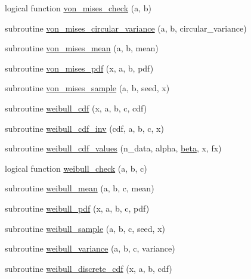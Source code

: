 \begin{DoxyCompactItemize}
\item 
logical function \hyperlink{_bhabha__fortran__sem__doxy_8f_a40a097c025b70be0e09b0de70e1da45b}{von\+\_\+mises\+\_\+check} (a, b)
\item 
subroutine \hyperlink{_bhabha__fortran__sem__doxy_8f_a662131cbe821a341319c8a9ca67f95af}{von\+\_\+mises\+\_\+circular\+\_\+variance} (a, b, circular\+\_\+variance)
\item 
subroutine \hyperlink{_bhabha__fortran__sem__doxy_8f_a97b8b21e59cd05efc755304eb6fd543f}{von\+\_\+mises\+\_\+mean} (a, b, mean)
\item 
subroutine \hyperlink{_bhabha__fortran__sem__doxy_8f_a385af85b16bbe1659e0de9e6e916d3d3}{von\+\_\+mises\+\_\+pdf} (x, a, b, pdf)
\item 
subroutine \hyperlink{_bhabha__fortran__sem__doxy_8f_a06bd71cbe32f074e5bb5ca85524936be}{von\+\_\+mises\+\_\+sample} (a, b, seed, x)
\item 
subroutine \hyperlink{_bhabha__fortran__sem__doxy_8f_ae3e1a96ae8ad17ffd698fba05207d5f8}{weibull\+\_\+cdf} (x, a, b, c, cdf)
\item 
subroutine \hyperlink{_bhabha__fortran__sem__doxy_8f_a017a7f1ff8e2de34d608525f4fa057da}{weibull\+\_\+cdf\+\_\+inv} (cdf, a, b, c, x)
\item 
subroutine \hyperlink{_bhabha__fortran__sem__doxy_8f_aed1852e1d63e6ebf573f1ff0e117f958}{weibull\+\_\+cdf\+\_\+values} (n\+\_\+data, alpha, \hyperlink{_bhabha__fortran__sem__doxy_8f_a4545c4482f31f1e6eddae40f6ed6bbfb}{beta}, x, fx)
\item 
logical function \hyperlink{_bhabha__fortran__sem__doxy_8f_afb02fe9720b1d511216ff02e43dc6b5e}{weibull\+\_\+check} (a, b, c)
\item 
subroutine \hyperlink{_bhabha__fortran__sem__doxy_8f_a023bd1260ec4d716669eca0aa0309343}{weibull\+\_\+mean} (a, b, c, mean)
\item 
subroutine \hyperlink{_bhabha__fortran__sem__doxy_8f_a9f72d60350cbaeb6b488cd822a8b59c3}{weibull\+\_\+pdf} (x, a, b, c, pdf)
\item 
subroutine \hyperlink{_bhabha__fortran__sem__doxy_8f_a9f7c934964fac585c5369f957382eab0}{weibull\+\_\+sample} (a, b, c, seed, x)
\item 
subroutine \hyperlink{_bhabha__fortran__sem__doxy_8f_a5c4e758650cdd5f1f407a932e1cde105}{weibull\+\_\+variance} (a, b, c, variance)
\item 
subroutine \hyperlink{_bhabha__fortran__sem__doxy_8f_ab34b5e8666ea41c5ab564c56a11e88f1}{weibull\+\_\+discrete\+\_\+cdf} (x, a, b, cdf)
\item 

\end{DoxyCompactItemize}
